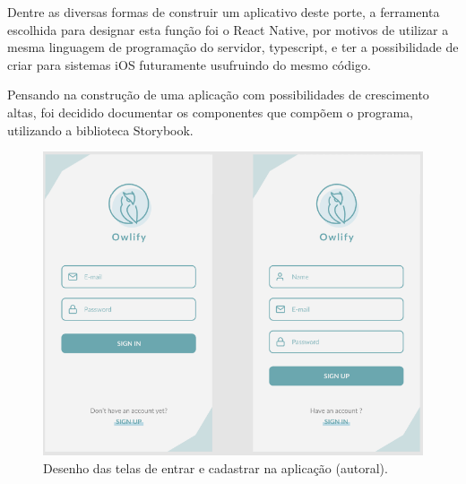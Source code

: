 Dentre as diversas formas de construir um aplicativo deste porte, a ferramenta escolhida para designar esta função foi o React Native, por motivos de utilizar a mesma linguagem de programação do servidor, typescript, e ter a possibilidade de criar para sistemas iOS futuramente usufruindo do mesmo código.

Pensando na construção de uma aplicação com possibilidades de crescimento altas, foi decidido documentar os componentes que compõem o programa, utilizando a biblioteca Storybook.

\begin{figure}[H]
  \centering
  \includegraphics[width=.80\textwidth]{assets/example-app-screens.png} 
  \caption{Desenho das telas de entrar e cadastrar na aplicação (autoral).}
  \label{fig:app-screns-login} 
\end{figure}